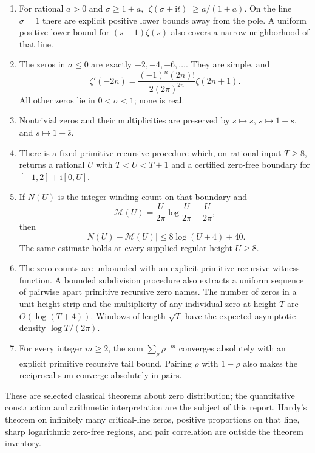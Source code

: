 \documentclass[11pt,letterpaper]{article}
\theoremstyle{definition}
\newcommand{\ii}{\mathrm i}\newcommand{\ee}{\mathrm e}
\newcommand{\abs}[1]{\lvert #1\rvert}
\begin{document}
\begin{enumerate}
\item For rational $a>0$ and $\sigma\ge1+a$,
      $\abs{\zeta(\sigma+\ii t)}\ge a/(1+a)$.
      On the line $\sigma=1$ there are explicit positive lower bounds
      away from the pole. A uniform positive lower bound for
      $(s-1)\zeta(s)$ also covers a narrow neighborhood of that line.
\item The zeros in $\sigma\le0$ are exactly $-2,-4,-6,\ldots$.
      They are simple, and
      \[
       \zeta'(-2n)=
       \frac{(-1)^n(2n)!}{2(2\pi)^{2n}}\zeta(2n+1).
      \]
      All other zeros lie in $0<\sigma<1$; none is real.
\item Nontrivial zeros and their multiplicities are preserved by
      $s\mapsto\bar s$, $s\mapsto1-s$, and
      $s\mapsto1-\bar s$.
\item There is a fixed primitive recursive procedure which, on rational
      input $T\ge8$, returns a rational $U$ with $T<U<T+1$ and
      a certified zero-free boundary for
      $[-1,2]+\ii[0,U]$.
\item If $N(U)$ is the integer winding count on that boundary and
      \[
       \mathcal M(U)=\frac{U}{2\pi}\log\frac{U}{2\pi}-\frac{U}{2\pi},
      \]
      then
      \begin{equation}
       \boxed{\abs{N(U)-\mathcal M(U)}\le 8\log(U+4)+40.}
       \label{eq:main-rvm}
      \end{equation}
      The same estimate holds at every supplied regular height $U\ge8$.
\item The zero counts are unbounded with an explicit primitive recursive
      witness function. A bounded subdivision procedure also extracts
      a uniform sequence of pairwise apart primitive recursive zero names.
      The number of zeros in a unit-height strip and
      the multiplicity of any individual zero at height $T$ are
      $O(\log(T+4))$. Windows of length $\sqrt T$ have the expected
      asymptotic density $\log T/(2\pi)$.
\item For every integer $m\ge2$, the sum
      $\sum_\rho\rho^{-m}$ converges absolutely with an explicit
      primitive recursive tail bound. Pairing $\rho$ with $1-\rho$
      also makes the reciprocal sum converge absolutely in pairs.
\end{enumerate}
These are selected classical theorems about zero distribution; the
quantitative construction and arithmetic interpretation are the subject
of this report. Hardy's theorem on infinitely many critical-line zeros,
positive proportions on that line, sharp logarithmic zero-free regions,
and pair correlation are outside the theorem inventory.
\end{document}
